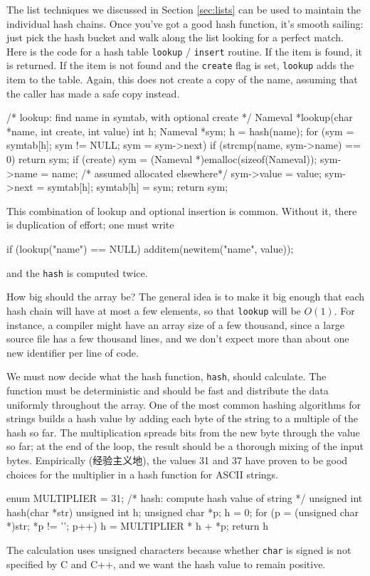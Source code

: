 The list techniques we discussed in Section \ref{sec:lists} can be used to
maintain the individual hash chains. Once you've got a good hash function,
it's smooth sailing: just pick the hash bucket and walk along the list
looking for a perfect match. Here is the code for a hash table
\verb'lookup' / \verb'insert' routine. If the item is found, it is
returned.  If the item is not found and the \verb'create' flag is set,
\verb'lookup' adds the item to the table.  Again, this does not create a
copy of the name, assuming that the caller has made a safe copy instead.
\begin{wellcode}
    /* lookup: find name in symtab, with optional create */
    Nameval *lookup(char *name, int create, int value)
    {
        int h;
        Nameval *sym;
        h = hash(name);
        for (sym = symtab[h]; sym != NULL; sym = sym->next)
            if (strcmp(name, sym->name) == 0)
                return sym;
        if (create) {
            sym = (Nameval *)emalloc(sizeof(Nameval));
            sym->name = name;   /* assumed allocated elsewhere*/
            sym->value = value;
            sym->next = symtab[h];
            symtab[h] = sym;
        }
        return sym;
    }
\end{wellcode}
This combination of lookup and optional insertion is common. Without it,
there is duplication of effort; one must write 
\begin{wellcode}
    if (lookup("name") == NULL)
        additem(newitem("name", value));
\end{wellcode}
and the \verb'hash' is computed twice.

How big should the array be? The general idea is to make it big enough that
each hash chain will have at most a few elements, so that \verb'lookup' will be
$O(1)$. For instance, a compiler might have an array size of a few
thousand, since a large source file has a few thousand lines, and we don't
expect more than about one new identifier per line of code.

We must now decide what the hash function, \verb'hash', should calculate.
The function must be deterministic and should be fast and distribute the
data uniformly throughout the array. One of the most common hashing
algorithms for strings builds a hash value by adding each byte of the
string to a multiple of the hash so far. The multiplication spreads bits
from the new byte through the value so far; at the end of the loop, the
result should be a thorough mixing of the input bytes. Empirically
(经验主义地), the values 31 and 37 have proven to be good choices for the
multiplier in a hash function for ASCII strings.
\begin{wellcode}
    enum {MULTIPLIER = 31};
    /* hash: compute hash value of string */
    unsigned int hash(char *str)
    {
        unsigned int h;
        unsigned char *p;
        h = 0;
        for (p = (unsigned char *)str; *p != '\0'; p++)
            h = MULTIPLIER * h + *p;
        return h %
    }
\end{wellcode}
The calculation uses unsigned characters because whether \verb'char' is
signed is not specified by C and C++, and we want the hash value to remain
positive.

